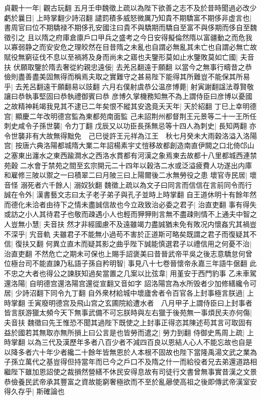 貞觀十一年|{
	觀古玩翻}
五月壬申魏徵上疏以為陛下欲善之志不及於昔時聞過必改少虧於曩日|{
	上時掌翻少詩沼翻}
譴罰積多威怒微厲乃知貴不期驕富不期侈非虚言也|{
	書周官曰位不期驕禄不期侈孔安國注曰貴不與驕期而驕自至富不與侈期而侈自至魏徵引之}
且以隋之府庫倉廪戶口甲兵之盛考之今日安得擬倫然隋以富疆動之而危我以寡弱静之而安安危之理皎然在目昔隋之未亂也自謂必無亂其未亡也自謂必無亡故賦役無窮征伐不息以至禍將及身而尚未之寤也夫鑒形莫如止水鑒敗莫如亡國|{
	夫音扶}
伏願取鑒於隋去奢從約親忠遠佞|{
	去羌呂翻遠于願翻}
以當今之無事行疇昔之恭儉則盡善盡美固無得而稱焉夫取之實難守之甚易陛下能得其所難豈不能保其所易乎|{
	去羌呂翻遠干願翻易以豉翻}
六月右僕射虞恭公温彦博薨|{
	射寅謝翻諡法尊賢敬讓曰恭執事堅固曰恭執禮御賓曰恭}
彦博久掌機務知無不為上謂侍臣曰彦博以憂國之故精神耗竭我見其不逮已二年矣恨不縱其安逸竟夭天年|{
	天於紹翻}
丁巳上幸明德宫|{
	顯慶二年改明德宫監為東都苑南面監}
己未詔荆州都督荆王元景等二十一王所任刺史咸令子孫世襲|{
	令力丁翻}
戊辰又以功臣長孫無忌等十四人為刺史|{
	長知两翻}
亦令世襲非有大故無得黜免　己巳徙許王元祥為江王　秋七月癸未大雨穀洛溢入洛陽宫|{
	按唐六典洛陽都城隋大業二年詔楊素宇丈愷移故都創造南直伊闕之口北倚邙山之塞東出瀍水之東西踰澗水之西洛水貫都有河漢之象焉東去故都十八里都城西連禁苑穀二水會于禁苑之間至玄宗開元二十四年以穀洛二水或泛溢疲費人功遂出内庫和雇修三陂以禦之一曰積翠二曰月陂三曰上陽爾後二水無勞役之患}
壞官寺民居|{
	壞音怪}
溺死者六千餘人|{
	溺奴狄翻}
魏徵上疏以為文子曰同言而信信在言前同令而行誠在令外|{
	漢書藝文志曰太子老子弟子與孔子並時上時掌翻}
自王道休明十有餘年然而德化未洽者由待下之情未盡誠信故也今立政致治必委之君子|{
	治直吏翻}
事有得失或訪之小人其待君子也敬而疎遇小人也輕而狎狎則言無不盡疎則情不上通夫中智之人豈無小慧|{
	夫音扶}
然才非經國慮不及遠雖竭力盡誠猶未免有敗况内懷姦宄其禍豈不深乎|{
	宄音軌}
夫雖君子不能無小過苟不害於正道斯可略矣既謂之君子而復疑其不信|{
	復扶又翻}
何異立直木而疑其影之曲乎陛下誠能慎選君子以禮信用之何憂不治|{
	治直吏翻}
不然危亡之期未可保也上賜手詔褒美曰昔晉武帝平吳之後志意驕怠何曾位極台司不能直諫乃私語子孫自矜明智|{
	事見八十七卷晉懷帝永嘉三年語牛倨翻}
此不忠之大者也得公之諫朕知過矣當置之几案以比弦韋|{
	用堇安于西門豹事}
乙未車駕還洛陽|{
	自明德宫還洛陽宫還從宣翻又音如字}
詔洛陽宫為水所毁者少加修繕纔令可居|{
	少詩沼翻下同令九丁翻}
自外衆材給城中壞廬舍者令百官各上封事極言朕過|{
	上時掌翻}
壬寅廢明德宫及飛山宫之玄圃院給遭水者　八月甲子上謂侍臣曰上封事者皆言朕游獵太頻今天下無事武備不可忘朕時與左右獵于後苑無一事煩民夫亦何傷|{
	夫音扶}
魏徵曰先王惟恐不聞其過陛下既使之上封事正得恣其陳述苟其言可取固有益於國若其無取亦無所損上曰公言是也皆勞而遣之|{
	勞力到翻}
侍御史馬周上疏|{
	上時掌翻}
以為三代及漢歷年多者八百少者不減四百良以恩結人心人不能忘故也自是以降多者六十年少者纔二十餘年皆無恩於人本根不固故也陛下當隆禹湯文武之業為子孫立萬代之基豈得但持當年而已今之戶口不及隋之什一而給役者兄去弟還道路相繼陛下雖加恩詔使之裁損然營繕不休民安得息故有司徒行文書曾無事實昔漢之文景恭儉養民武帝承其豐富之資故能窮奢極欲而不至於亂曏使高祖之後即傳武帝漢室安得久存乎|{
	斯確論也}
